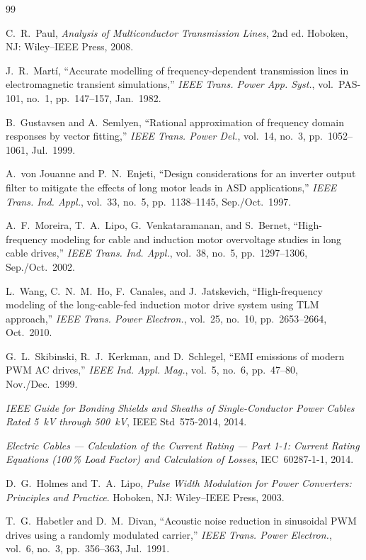 \documentclass[11pt,a4paper,oneside]{book}
\begin{document}
\begin{thebibliography}{99}
	
	 C.~R.~Paul, \emph{Analysis of Multiconductor Transmission Lines},
	2nd ed. Hoboken, NJ: Wiley--IEEE Press, 2008.
	
	 J.~R.~Mart\'i, ``Accurate modelling of frequency-dependent
	transmission lines in electromagnetic transient simulations,'' \emph{IEEE Trans.
		Power App. Syst.}, vol.~PAS-101, no.~1, pp.~147--157, Jan.~1982.
	
	 B.~Gustavsen and A.~Semlyen, ``Rational approximation of
	frequency domain responses by vector fitting,'' \emph{IEEE Trans. Power Del.},
	vol.~14, no.~3, pp.~1052--1061, Jul.~1999.
	
	 A.~von Jouanne and P.~N.~Enjeti, ``Design considerations for
	an inverter output filter to mitigate the effects of long motor leads in ASD
	applications,'' \emph{IEEE Trans. Ind. Appl.}, vol.~33, no.~5, pp.~1138--1145,
	Sep./Oct.~1997.
	
	 A.~F.~Moreira, T.~A.~Lipo, G.~Venkataramanan, and S.~Bernet,
	``High-frequency modeling for cable and induction motor overvoltage studies in
	long cable drives,'' \emph{IEEE Trans. Ind. Appl.}, vol.~38, no.~5,
	pp.~1297--1306, Sep./Oct.~2002.
	
	 L.~Wang, C.~N.~M.~Ho, F.~Canales, and J.~Jatskevich,
	``High-frequency modeling of the long-cable-fed induction motor drive system using
	TLM approach,'' \emph{IEEE Trans. Power Electron.}, vol.~25, no.~10,
	pp.~2653--2664, Oct.~2010.
	
	 G.~L.~Skibinski, R.~J.~Kerkman, and D.~Schlegel, ``EMI emissions
	of modern PWM AC drives,'' \emph{IEEE Ind. Appl. Mag.}, vol.~5, no.~6,
	pp.~47--80, Nov./Dec.~1999.
	
	 \emph{IEEE Guide for Bonding Shields and Sheaths of
		Single-Conductor Power Cables Rated 5~kV through 500~kV}, IEEE Std~575-2014, 2014.
	
	 \emph{Electric Cables --- Calculation of the Current Rating ---
		Part 1-1: Current Rating Equations (100\,\% Load Factor) and Calculation of
		Losses}, IEC~60287-1-1, 2014.
	
	 D.~G.~Holmes and T.~A.~Lipo, \emph{Pulse Width Modulation for
		Power Converters: Principles and Practice}. Hoboken, NJ: Wiley--IEEE Press, 2003.
	
	 T.~G.~Habetler and D.~M.~Divan, ``Acoustic noise reduction in
	sinusoidal PWM drives using a randomly modulated carrier,'' \emph{IEEE Trans. Power
		Electron.}, vol.~6, no.~3, pp.~356--363, Jul.~1991.
	

\end{thebibliography}
\end{document}

